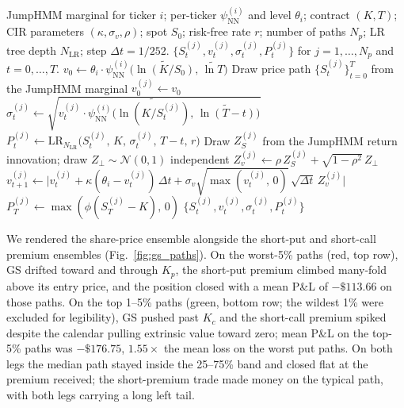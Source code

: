 \begin{algorithm}[ht]
\caption{Forward simulation of path-conditional option premia}\label{alg:forward_sim}
\begin{algorithmic}[1]
\Require JumpHMM marginal for ticker $i$; per-ticker $\psi_{\mathrm{NN}}^{(i)}$ and level $\theta_i$; contract $(K, T)$; CIR parameters $(\kappa, \sigma_v, \rho)$; spot $S_0$; risk-free rate $r$; number of paths $N_p$; LR tree depth $N_{\mathrm{LR}}$; step $\Delta t = 1/252$.
\Ensure $\{S_t^{(j)}, v_t^{(j)}, \sigma_t^{(j)}, P_t^{(j)}\}$ for $j = 1,\ldots,N_p$ and $t = 0, \ldots, T$.
\State $v_0 \gets \theta_i \cdot \psi_{\mathrm{NN}}^{(i)}\!\big(\widetilde{\ln(K/S_0)},\, \widetilde{\ln T}\big)$ 
  \State Draw price path $\{S_t^{(j)}\}_{t=0}^{T}$ from the JumpHMM marginal
  \State $v_0^{(j)} \gets v_0$
    \State $\sigma_t^{(j)} \gets \sqrt{v_t^{(j)} \cdot \psi_{\mathrm{NN}}^{(i)}\!\big(\widetilde{\ln(K/S_t^{(j)})},\, \widetilde{\ln(T-t)}\big)}$
    \State $P_t^{(j)} \gets \mathrm{LR}_{N_{\mathrm{LR}}}\!\big(S_t^{(j)},\, K,\, \sigma_t^{(j)},\, T-t,\, r\big)$ 
    \State Draw $Z_S^{(j)}$ from the JumpHMM return innovation; draw $Z_\perp \sim \mathcal{N}(0,1)$ independent
    \State $Z_v^{(j)} \gets \rho\, Z_S^{(j)} + \sqrt{1 - \rho^2}\, Z_\perp$ 
    \State $v_{t+1}^{(j)} \gets \big| v_t^{(j)} + \kappa(\theta_i - v_t^{(j)})\,\Delta t + \sigma_v \sqrt{\max(v_t^{(j)},\,0)}\,\sqrt{\Delta t}\, Z_v^{(j)} \big|$
  \EndFor
  \State $P_T^{(j)} \gets \max(\phi (S_T^{(j)} - K),\, 0)$ 
\EndFor
\State \Return $\{S_t^{(j)}, v_t^{(j)}, \sigma_t^{(j)}, P_t^{(j)}\}$
\end{algorithmic}
\end{algorithm}

We rendered the share-price ensemble alongside the short-put and short-call premium ensembles (Fig.~\ref{fig:gs_paths}). On the worst-5\% paths (red, top row), GS drifted toward and through $K_p$, the short-put premium climbed many-fold above its entry price, and the position closed with a mean P\&L of $-\$113.66$ on those paths. On the top 1--5\% paths (green, bottom row; the wildest 1\% were excluded for legibility), GS pushed past $K_c$ and the short-call premium spiked despite the calendar pulling extrinsic value toward zero; mean P\&L on the top-5\% paths was $-\$176.75$, $1.55{\times}$ the mean loss on the worst put paths. On both legs the median path stayed inside the 25--75\% band and closed flat at the premium received; the short-premium trade made money on the typical path, with both legs carrying a long left tail.

